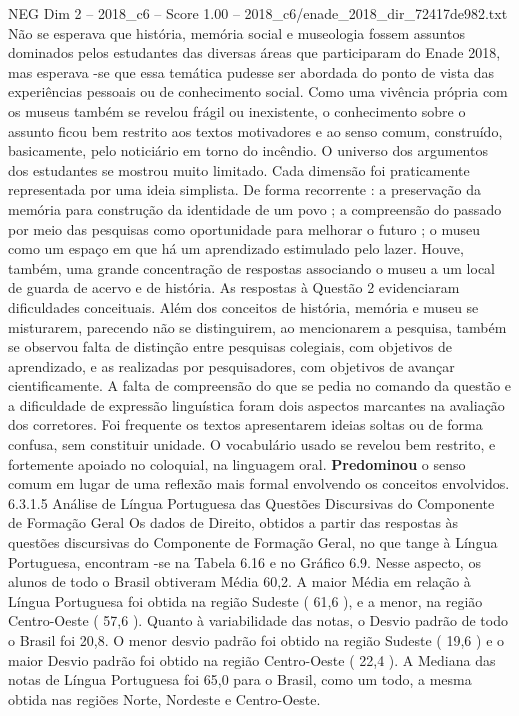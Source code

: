 \begin{textsample}{NEG Dim 2 – 2018\_c6 – Score 1.00 – 2018\_c6/enade\_2018\_dir\_72417de982.txt}
Não se esperava que história, memória social e museologia fossem assuntos dominados pelos estudantes das diversas áreas que participaram do Enade 2018, mas esperava -se que essa temática pudesse ser abordada do ponto de vista das experiências pessoais ou de conhecimento social.
Como uma vivência própria com os museus também se revelou frágil ou inexistente, o conhecimento sobre o assunto ficou bem restrito aos textos motivadores e ao senso comum, construído, basicamente, pelo noticiário em torno do incêndio.
O universo dos argumentos dos estudantes se mostrou muito limitado.
Cada dimensão foi praticamente representada por uma ideia simplista.
De forma recorrente : a preservação da memória para construção da identidade de um povo ; a compreensão do passado por meio das pesquisas como oportunidade para melhorar o futuro ; o museu como um espaço em que há um aprendizado estimulado pelo lazer.
Houve, também, uma grande concentração de respostas associando o museu a um local de guarda de acervo e de história.
As respostas à Questão 2 evidenciaram dificuldades conceituais.
Além dos conceitos de história, memória e museu se misturarem, parecendo não se distinguirem, ao mencionarem a pesquisa, também se observou falta de distinção entre pesquisas colegiais, com objetivos de aprendizado, e as realizadas por pesquisadores, com objetivos de avançar cientificamente.
A falta de compreensão do que se pedia no comando da questão e a dificuldade de expressão linguística foram dois aspectos marcantes na avaliação dos corretores.
Foi frequente os textos apresentarem ideias soltas ou de forma confusa, sem constituir unidade.
O vocabulário usado se revelou bem restrito, e fortemente apoiado no coloquial, na linguagem oral. \textbf{Predominou} o senso comum em lugar de uma reflexão mais formal envolvendo os conceitos envolvidos. 6.3.1.5 Análise de Língua Portuguesa das Questões Discursivas do Componente de Formação Geral Os dados de Direito, obtidos a partir das respostas às questões discursivas do Componente de Formação Geral, no que tange à Língua Portuguesa, encontram -se na Tabela 6.16 e no Gráfico 6.9.
Nesse aspecto, os alunos de todo o Brasil obtiveram Média 60,2.
A maior Média em relação à Língua Portuguesa foi obtida na região Sudeste ( 61,6 ), e a menor, na região Centro-Oeste ( 57,6 ).
Quanto à variabilidade das notas, o Desvio padrão de todo o Brasil foi 20,8.
O menor desvio padrão foi obtido na região Sudeste ( 19,6 ) e o maior Desvio padrão foi obtido na região Centro-Oeste ( 22,4 ).
A Mediana das notas de Língua Portuguesa foi 65,0 para o Brasil, como um todo, a mesma obtida nas regiões Norte, Nordeste e Centro-Oeste.

\end{textsample}
